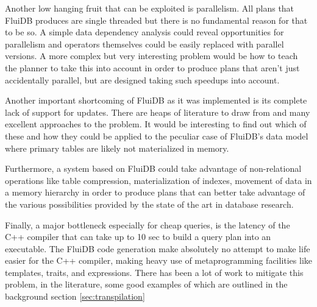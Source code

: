 Another low hanging fruit that can be exploited is parallelism. All
plans that FluiDB produces are single threaded but there is no
fundamental reason for that to be so. A simple data dependency
analysis could reveal opportunities for parallelism and operators
themselves could be easily replaced with parallel versions. A more
complex but very interesting problem would be how to teach the planner
to take this into account in order to produce plans that aren't just
accidentally parallel, but are designed taking such speedups into
account.

Another important shortcoming of FluiDB as it was implemented is its
complete lack of support for updates. There are heaps of literature to
draw from and many excellent approaches to the problem. It would be
interesting to find out which of these and how they could be applied
to the peculiar case of FluiDB's data model where primary tables are
likely not materialized in memory.

Furthermore, a system based on FluiDB could take advantage of
non-relational operations like table compression, materialization of
indexes, movement of data in a memory hierarchy in order to produce
plans that can better take advantage of the various possibilities
provided by the state of the art in database research.

Finally, a major bottleneck especially for cheap queries, is the
latency of the C++ compiler that can take up to 10 sec to build a
query plan into an executable. The FluiDB code generation make
absolutely no attempt to make life easier for the C++ compiler, making
heavy use of metaprogramming facilities like templates, traits, and
 expressions. There has been a lot of work to mitigate
this problem, in the literature, some good examples of which are
outlined in the background section \ref{sec:transpilation}
